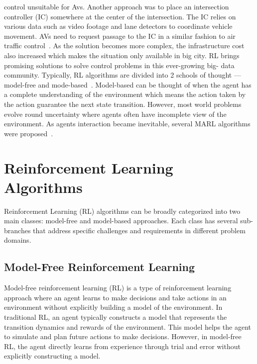 control unsuitable for Avs.
Another approach was to place an
intersection controller (IC) somewhere at the center of the
intersection.
The IC relies on various data such as video
footage and lane detectors to coordinate vehicle movement.
AVs need to request passage to the IC in a similar fashion to
air traffic control~\cite{li2021planning, gunarathna2022intelligent, qian2017autonomous, chen2019intersection}.
As the solution becomes more
complex, the infrastructure cost also increased which makes
the situation only available in big city.
RL brings promising
solutions to solve control problems in this ever-growing big-
data community.
Typically, RL algorithms are divided into 2
schools of thought — model-free and mode-based~\cite{sutton2018reinforcement}.
Model-based can be thought of when the agent has a complete
understanding of the environment which means the action
taken by the action guarantee the next state transition.
However, most world problems evolve round uncertainty
where agents often have incomplete view of the environment.
As agents interaction became inevitable, several MARL
algorithms were proposed~\cite{peng2021learning, yang2018mean, johanson2021emergent, tang2020towards, oroojlooyjadid2019review, siekmann1998agent, zhou2020smarts, zhang2019multiagent}.
\section{Reinforcement Learning Algorithms}\label{sec:reinforcement-learning-algorithms}

Reinforcement Learning (RL) algorithms can be broadly categorized into two main classes: model-free and model-based approaches. Each class has several sub-branches that address specific challenges and requirements in different problem domains.

\subsection{Model-Free Reinforcement Learning}\label{subsec:model-free-reinforcement-learning}
Model-free reinforcement learning (RL) is a type of reinforcement learning approach where an agent learns to make decisions and take actions in an environment without explicitly building a model of the environment. In traditional RL, an agent typically constructs a model that represents the transition dynamics and rewards of the environment. This model helps the agent to simulate and plan future actions to make decisions. However, in model-free RL, the agent directly learns from experience through trial and error without explicitly constructing a model.


